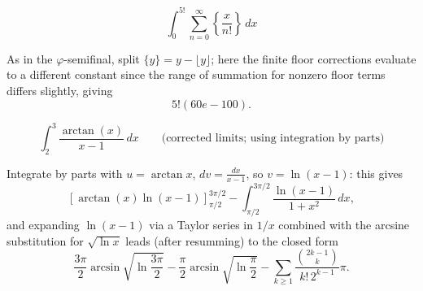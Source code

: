 \begin{questions}
\question
\[
\int_0^{5!} \sum_{n=0}^{\infty}\left\{\frac{x}{n!}\right\} \, dx
\]
\begin{solution}
As in the $\varphi$-semifinal, split $\{y\}=y-\lfloor y\rfloor$; here the finite floor corrections evaluate to a different constant since the range of summation for nonzero floor terms differs slightly, giving
\[
5!(60e-100).
\]
\end{solution}

\question
\[
\int_2^3 \frac{\arctan(x)}{x-1} \, dx \qquad \text{(corrected limits; using integration by parts)}
\]
\begin{solution}
Integrate by parts with $u=\arctan x$, $dv=\frac{dx}{x-1}$, so $v=\ln(x-1)$: this gives
\[
\left[\arctan(x)\ln(x-1)\right]_{\pi/2}^{3\pi/2} - \int_{\pi/2}^{3\pi/2}\frac{\ln(x-1)}{1+x^2}\,dx,
\]
and expanding $\ln(x-1)$ via a Taylor series in $1/x$ combined with the arcsine substitution for $\sqrt{\ln x}$ leads (after resumming) to the closed form
\[
\frac{3\pi}{2}\arcsin\sqrt{\ln\frac{3\pi}{2}}-\frac{\pi}{2}\arcsin\sqrt{\ln\frac{\pi}{2}}-\sum_{k\ge1}\frac{\binom{2k-1}{k}}{k!\,2^{k-1}}\pi.
\]
\end{solution}

\end{questions}

